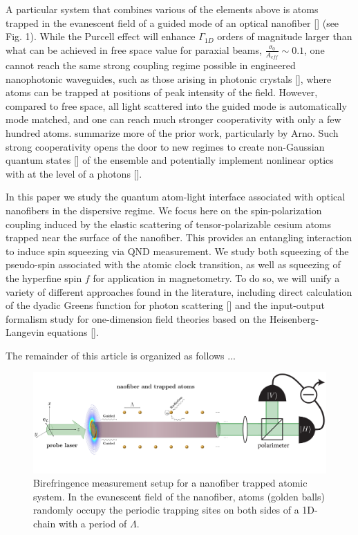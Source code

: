 \documentclass[preprint,aps,pra,onecolumn]{revtex4-1} %
\begin{document}
A particular system that combines various of the elements above is atoms trapped in the evanescent 
field of a guided mode of an optical nanofiber [] (see Fig. 1).  While the Purcell effect will enhance 
$\Gamma_{1D}$ orders of magnitude larger than what can be achieved in free space value for paraxial 
beams,  $\frac{\sigma_0}{A_{eff}} \sim 0.1$, one cannot reach the same strong coupling regime possible 
in engineered nanophotonic waveguides, such as those arising in photonic crystals [], where atoms can 
be trapped at positions of peak intensity of the field.  However, compared to free space, all light 
scattered into the guided mode is automatically mode matched, and one can reach much stronger 
cooperativity with only a few hundred atoms.  {\color{red}  summarize more of the prior work, 
particularly by Arno}.  Such strong cooperativity opens the door to new regimes to create non-Gaussian 
quantum states [] of the ensemble and potentially implement nonlinear optics with at the level of a 
photons [].

In this paper we study the quantum atom-light interface associated with optical nanofibers in the 
dispersive regime.  We focus here on the spin-polarization coupling induced by the elastic scattering of 
tensor-polarizable cesium atoms trapped near the surface of the nanofiber.  This provides an entangling 
interaction to induce spin squeezing via QND measurement.  We study both squeezing of the 
pseudo-spin associated with the atomic clock transition, as well as squeezing of the hyperfine spin $f$ 
for application in magnetometry.  To do so, we will unify a variety of different approaches found in the 
literature, including direct calculation of the dyadic Greens function for photon scattering [] and the 
input-output formalism study for one-dimension field theories based on the Heisenberg-Langevin 
equations [].

The remainder of this article is organized as follows ...

\begin{figure}
\centering
\includegraphics[scale=0.35]{./Figs/BirefringenceMeasurement_randomAtoms}
\caption{Birefringence measurement setup for a nanofiber trapped atomic system. In the evanescent 
field of the nanofiber, atoms (golden balls) randomly  occupy the periodic trapping sites on both sides of 
a 1D-chain with a period of $\Lambda$.}
\label{fig:BirefringenceMeasurement}
\end{figure}
\end{document}
